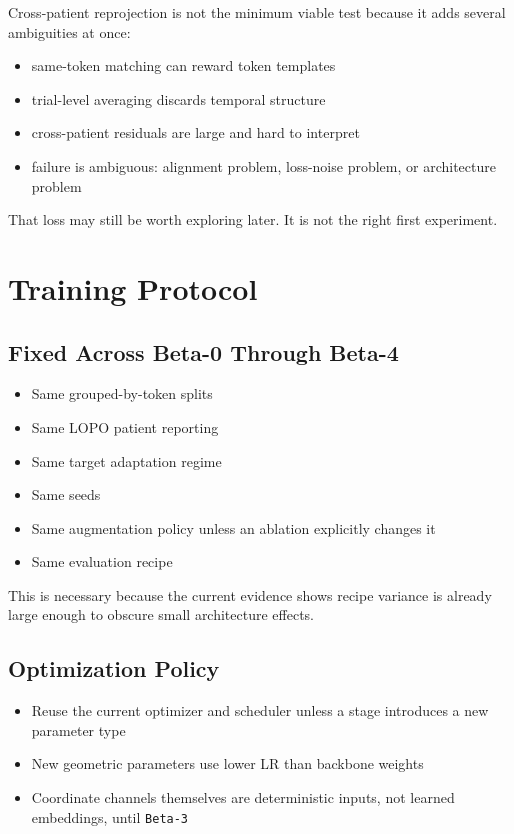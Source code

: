 \documentclass[
]{article}
\providecommand{\tightlist}{%
  \setlength{\itemsep}{0pt}\setlength{\parskip}{0pt}}
\begin{document}
Cross-patient reprojection is not the minimum viable test because it
adds several ambiguities at once:

\begin{itemize}
\tightlist
\item
  same-token matching can reward token templates
\item
  trial-level averaging discards temporal structure
\item
  cross-patient residuals are large and hard to interpret
\item
  failure is ambiguous: alignment problem, loss-noise problem, or
  architecture problem
\end{itemize}

That loss may still be worth exploring later. It is not the right first
experiment.

\section{Training Protocol}\label{training-protocol}

\subsection{Fixed Across Beta-0 Through
Beta-4}\label{fixed-across-beta-0-through-beta-4}

\begin{itemize}
\tightlist
\item
  Same grouped-by-token splits
\item
  Same LOPO patient reporting
\item
  Same target adaptation regime
\item
  Same seeds
\item
  Same augmentation policy unless an ablation explicitly changes it
\item
  Same evaluation recipe
\end{itemize}

This is necessary because the current evidence shows recipe variance is
already large enough to obscure small architecture effects.

\subsection{Optimization Policy}\label{optimization-policy}

\begin{itemize}
\tightlist
\item
  Reuse the current optimizer and scheduler unless a stage introduces a
  new parameter type
\item
  New geometric parameters use lower LR than backbone weights
\item
  Coordinate channels themselves are deterministic inputs, not learned
  embeddings, until \texttt{Beta-3}
\end{itemize}
\end{document}

